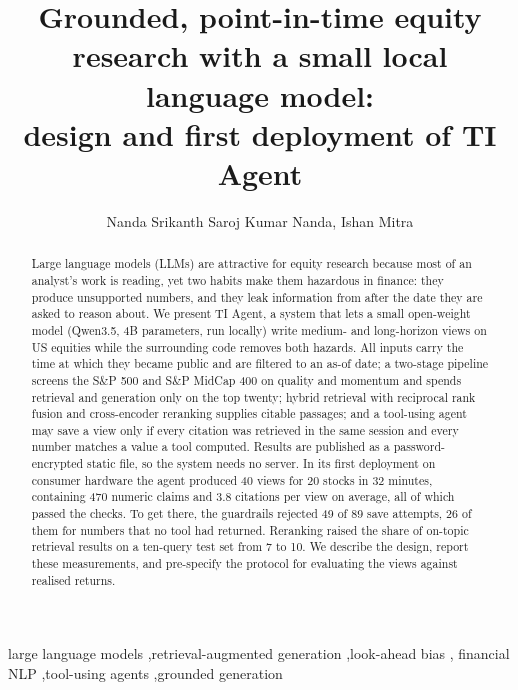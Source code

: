 \documentclass[preprint,11pt]{elsarticle}
\begin{document}
\begin{frontmatter}

\title{Grounded, point-in-time equity research with a small local language model:\\
design and first deployment of TI Agent}

\author{Nanda Srikanth Saroj Kumar Nanda, Ishan Mitra}
\address{LivQuantum Pvt. Ltd.}

\begin{abstract}
Large language models (LLMs) are attractive for equity research because most of an analyst's work is
reading, yet two habits make them hazardous in finance: they produce unsupported numbers, and they leak
information from after the date they are asked to reason about. We present TI Agent, a system that lets a
small open-weight model (Qwen3.5, 4B parameters, run locally) write medium- and long-horizon views on US
equities while the surrounding code removes both hazards. All inputs carry the time at which they became
public and are filtered to an as-of date; a two-stage pipeline screens the S\&P 500 and S\&P MidCap 400 on
quality and momentum and spends retrieval and generation only on the top twenty; hybrid retrieval with
reciprocal rank fusion and cross-encoder reranking supplies citable passages; and a tool-using agent may
save a view only if every citation was retrieved in the same session and every number matches a value a
tool computed. Results are published as a password-encrypted static file, so the system needs no server.
In its first deployment on consumer hardware the agent produced 40 views for 20 stocks in 32 minutes,
containing 470 numeric claims and 3.8 citations per view on average, all of which passed the checks.
To get there, the guardrails rejected 49 of 89 save attempts, 26 of them for numbers that no tool had
returned. Reranking raised the share of on-topic retrieval results on a ten-query test set from 7 to 10.
We describe the design, report these measurements, and pre-specify the protocol for evaluating the views
against realised returns.
\end{abstract}

\begin{keyword}
large language models \sep retrieval-augmented generation \sep look-ahead bias \sep
financial NLP \sep tool-using agents \sep grounded generation
\end{keyword}

\end{frontmatter}

\linenumbers
\end{document}
